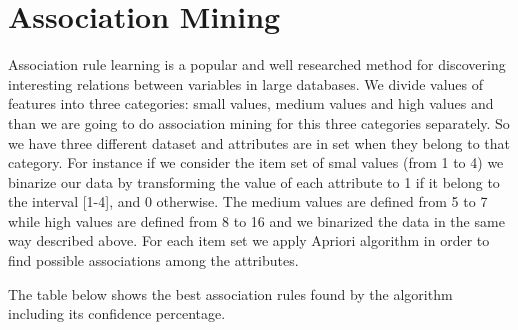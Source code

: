 \chapter*{Association Mining}

Association rule learning is a popular and well researched method for discovering interesting relations between variables in large databases. We divide values of features into three categories: small values, medium values and high values and than we are going to do association mining for this three categories separately. So we have three different dataset and attributes are in set when they belong to that category. For instance if we consider the item set of smal values (from 1 to 4)
  we binarize our data by transforming the value of each attribute to 1 if it belong to the interval [1-4], and 0 otherwise. The medium values are defined from 5 to 7 while   high values are defined from 8 to 16 and we binarized the data in the same way described above.
  For each item set we apply Apriori algorithm in order to find possible associations among the attributes.

  The table below shows the best association rules found by the algorithm including its confidence percentage.


